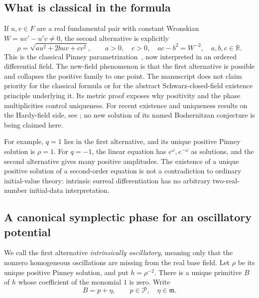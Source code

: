 \documentclass[11pt,a4paper]{article}
\numberwithin{equation}{section}
\theoremstyle{definition}
\theoremstyle{remark}
\newcommand{\R}{\mathbb R}
\newcommand{\mm}{\mathfrak m}
\newcommand{\PP}{\mathcal P}
\begin{document}
\subsection{What is classical in the formula}
If $u,v\in F$ are a real fundamental pair with constant Wronskian
$W=uv'-u'v\ne0$, the second alternative is explicitly
\begin{equation}\label{eq:pinney-classical}
 \rho=\sqrt{a u^2+2buv+c v^2},
 \qquad a>0,\quad c>0,\quad ac-b^2=W^{-2},
 \quad a,b,c\in\R.
\end{equation}
This is the classical Pinney parametrization~\cite{Pinney}, now interpreted
in an ordered differential field. The new-field phenomenon is that the
first alternative is possible and collapses the positive family to one
point. The manuscript does not claim priority for the classical formula
or for the abstract Schwarz-closed-field existence principle underlying
it. Its metric proof exposes why positivity and the phase multiplicities
control uniqueness.
For recent existence and uniqueness results on the Hardy-field side,
see \cite[Theorems A and B]{ADHSecond}; no new solution of its named
Boshernitzan conjecture is being claimed here.

For example, $q=1$ lies in the first alternative, and its unique positive
Pinney solution is $\rho=1$. For $q=-1$, the linear equation has
$e^{\omega},e^{-\omega}$ as solutions, and the second alternative gives
many positive amplitudes. The existence of a unique positive solution of a
second-order equation is not a contradiction to ordinary initial-value
theory: intrinsic surreal differentiation has no arbitrary two-real-number
initial-data interpretation.

\subsection{A canonical symplectic phase for an oscillatory potential}
We call the first alternative \emph{intrinsically oscillatory}, meaning
only that the nonzero homogeneous oscillations are missing from the real
base field. Let $\rho$ be its unique positive Pinney solution, and put
$h=\rho^{-2}$. There is a unique primitive $B$ of $h$ whose coefficient of
the monomial $1$ is zero. Write
\[
 B=p+\eta,\qquad p\in\PP,\quad\eta\in\mm.
\]
\end{document}
